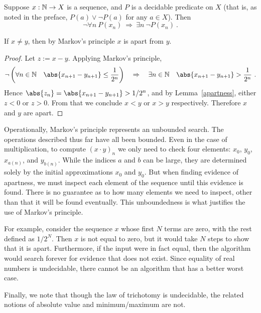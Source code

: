 \documentclass[leqno]{report}
\begin{document}
\begin{Definition}
    Suppose $x : \mathbb{N} \rightarrow X$ is a sequence, and $P$ is a decidable predicate on $X$ (that is, as noted in the preface, $P(a) \vee \neg P(a)$ for any $a \in X$). Then
    \[
        \neg \forall n\ P(x_n)
        \ \Rightarrow\ \exists n\ \neg P(x_n) \ .
    \]
\end{Definition}

\begin{Proposition}[Apartness]
    If $x \neq y$, then by Markov's principle $x$ is apart from $y$.
\end{Proposition}

\begin{proof}
    Let $z := x - y$. Applying Markov's principle,
    \[
        \neg \left( \fa{n \in \N}{\abs{x_{n+1} - y_{n+1}} \leq \frac{1}{2^n}} \right)
        \quad \Rightarrow \quad
        \ex{n \in \N}{\abs{x_{n+1} - y_{n+1}} > \frac{1}{2^n}} \ .
    \]
    Hence $\abs{z_n} = \abs{x_{n+1} - y_{n+1}} > 1/2^n$, and by Lemma~\ref{apartness}, either $z < 0$ or $z > 0$. From that we conclude $x < y$ or $x > y$ respectively. Therefore $x$ and $y$ are apart.
\end{proof}

Operationally, Markov's principle represents an unbounded search. The operations described thus far have all been bounded. Even in the case of multiplication, to compute $(x \cdot y)_n$ we only need to check four elements: $x_0$, $y_0$, $x_{a(n)}$, and $y_{b(n)}$. While the indices $a$ and $b$ can be large, they are determined solely by the initial approximations $x_0$ and $y_0$. But when finding evidence of apartness, we must inspect each element of the sequence until this evidence is found. There is no guarantee as to how many elements we need to inspect, other than that it will be found eventually. This unboundedness is what justifies the use of Markov's principle.

For example, consider the sequence $x$ whose first $N$ terms are zero, with the rest defined as $1/2^N$. Then $x$ is not equal to zero, but it would take $N$ steps to show that it is apart. Furthermore, if the input were in fact equal, then the algorithm would search forever for evidence that does not exist. Since equality of real numbers is undecidable, there cannot be an algorithm that has a better worst case.

Finally, we note that though the law of trichotomy is undecidable, the related notions of absolute value and minimum/maximum are not.
\end{document}
